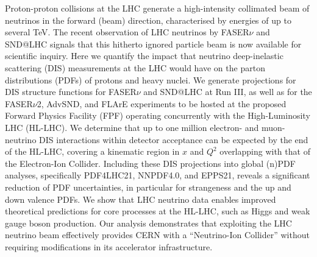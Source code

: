 \documentclass[11pt,a4paper]{article}
\numberwithin{equation}{section}
\numberwithin{figure}{section}
\numberwithin{table}{section}
\begin{document}
Proton-proton collisions at the LHC generate a high-intensity collimated beam of neutrinos
in the forward (beam) direction, characterised by energies of up to several TeV.
%
The recent  observation of LHC neutrinos by FASER$\nu$ and SND@LHC
signals that this hitherto ignored particle beam is now available for scientific inquiry.
%
Here we quantify the impact that neutrino deep-inelastic scattering (DIS)
measurements at the LHC would have
on the parton distributions (PDFs) of protons and heavy nuclei.
%
We generate projections for DIS structure functions
for FASER$\nu$ and SND@LHC at Run III,
as well as for the FASER$\nu$2, AdvSND, and FLArE experiments
to be  hosted at the proposed
Forward Physics Facility (FPF) operating concurrently with the High-Luminosity LHC (HL-LHC).
%
We determine that up to one million electron- and muon-neutrino DIS interactions
within detector acceptance can be expected by the end of the HL-LHC,
covering a kinematic region in $x$ and $Q^2$ overlapping with that
of the Electron-Ion Collider.
%
Including these DIS projections into
global (n)PDF analyses, specifically PDF4LHC21, NNPDF4.0,
and EPPS21,  reveals a significant reduction of PDF uncertainties, in particular
for strangeness and the up and down valence PDFs.
%
We show that LHC neutrino data enables improved theoretical
predictions for core processes at the HL-LHC, such as Higgs and weak gauge
boson production.
%
Our analysis demonstrates that exploiting the LHC neutrino beam effectively
provides CERN with a ``Neutrino-Ion Collider''
without  requiring modifications in its accelerator infrastructure.

\clearpage

\tableofcontents





\appendix




%

\end{document}
